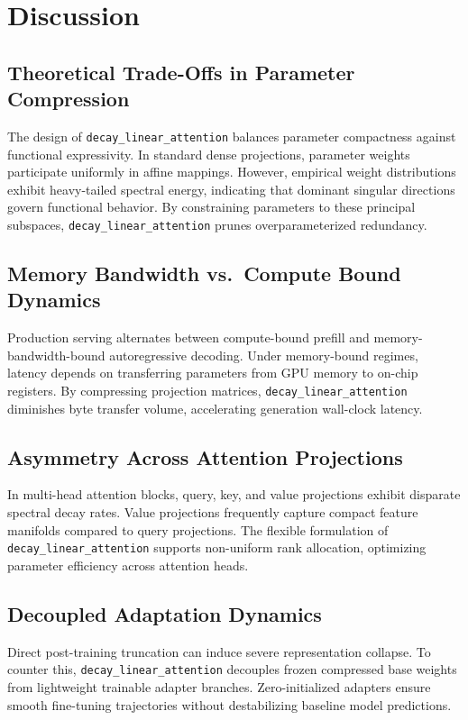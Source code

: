 \section{Discussion}

\subsection{Theoretical Trade-Offs in Parameter Compression}
The design of \texttt{decay\_linear\_attention} balances parameter compactness against functional expressivity. In standard dense projections, parameter weights participate uniformly in affine mappings. However, empirical weight distributions exhibit heavy-tailed spectral energy, indicating that dominant singular directions govern functional behavior. By constraining parameters to these principal subspaces, \texttt{decay\_linear\_attention} prunes overparameterized redundancy.

\subsection{Memory Bandwidth vs.\ Compute Bound Dynamics}
Production serving alternates between compute-bound prefill and memory-bandwidth-bound autoregressive decoding. Under memory-bound regimes, latency depends on transferring parameters from GPU memory to on-chip registers. By compressing projection matrices, \texttt{decay\_linear\_attention} diminishes byte transfer volume, accelerating generation wall-clock latency.

\subsection{Asymmetry Across Attention Projections}
In multi-head attention blocks, query, key, and value projections exhibit disparate spectral decay rates. Value projections frequently capture compact feature manifolds compared to query projections. The flexible formulation of \texttt{decay\_linear\_attention} supports non-uniform rank allocation, optimizing parameter efficiency across attention heads.

\subsection{Decoupled Adaptation Dynamics}
Direct post-training truncation can induce severe representation collapse. To counter this, \texttt{decay\_linear\_attention} decouples frozen compressed base weights from lightweight trainable adapter branches. Zero-initialized adapters ensure smooth fine-tuning trajectories without destabilizing baseline model predictions.

